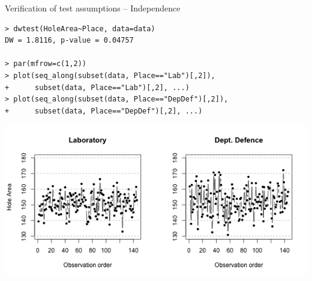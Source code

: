\begin{frame}[fragile]{Verification of test assumptions -- Independence}

{\smaller
\begin{verbatim}
> dwtest(HoleArea~Place, data=data)
DW = 1.8116, p-value = 0.04757

> par(mfrow=c(1,2))
> plot(seq_along(subset(data, Place=="Lab")[,2]),
+      subset(data, Place=="Lab")[,2], ...)
> plot(seq_along(subset(data, Place=="DepDef")[,2]),
+      subset(data, Place=="DepDef")[,2], ...)
\end{verbatim}}

\includegraphics[width=.7\textwidth]{../img/labdata-resplot.png}
\end{frame}
